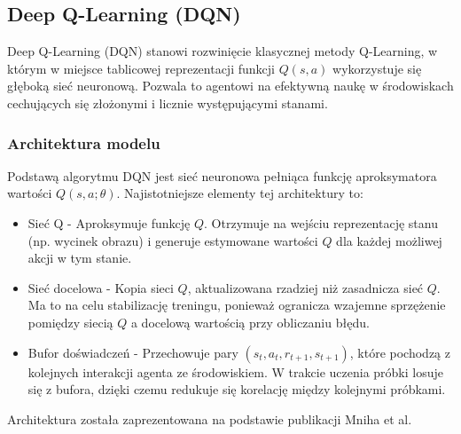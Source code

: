 \documentclass[a4paper, 12pt]{article}
\numberwithin{equation}{section}
\begin{document}
    \subsection{Deep Q-Learning (DQN)}
    Deep Q-Learning (DQN) stanowi rozwinięcie klasycznej metody Q-Learning, w którym w miejsce tablicowej reprezentacji funkcji \( Q(s,a) \) wykorzystuje się głęboką sieć neuronową. Pozwala to agentowi na efektywną naukę w środowiskach cechujących się złożonymi i licznie występującymi stanami.
    \subsubsection{Architektura modelu}
    Podstawą algorytmu DQN jest sieć neuronowa pełniąca funkcję aproksymatora wartości \( Q(s,a;\theta) \). Najistotniejsze elementy tej architektury to:
    \begin{itemize}
        \item Sieć Q - Aproksymuje funkcję \( Q \). Otrzymuje na wejściu reprezentację stanu (np. wycinek obrazu) i generuje estymowane wartości \( Q \) dla każdej możliwej akcji w tym stanie.
        \item Sieć docelowa - Kopia sieci \( Q \), aktualizowana rzadziej niż zasadnicza sieć \( Q \). Ma to na celu stabilizację treningu, ponieważ ogranicza wzajemne sprzężenie pomiędzy siecią \( Q \) a docelową wartością przy obliczaniu błędu.
        \item Bufor doświadczeń - Przechowuje pary \( ( s_t, a_t, r_{t+1}, s_{t+1}) \), które pochodzą z kolejnych interakcji agenta ze środowiskiem. W trakcie uczenia próbki losuje się z bufora, dzięki czemu redukuje się korelację między kolejnymi próbkami.
    \end{itemize}
    Architektura została zaprezentowana na podstawie publikacji Mniha et al. \cite{mnih2015nature}
\end{document}
